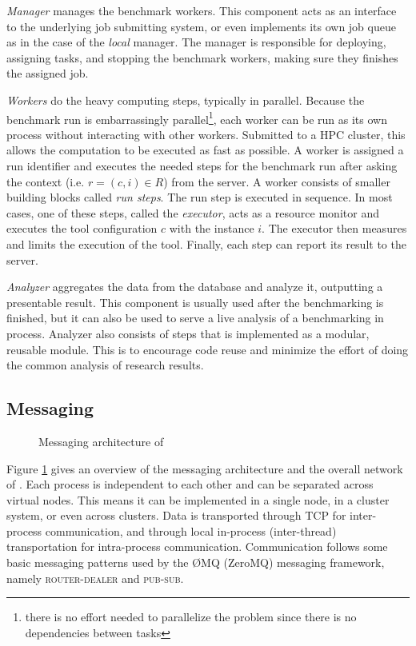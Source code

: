 \emph{Manager} manages the benchmark workers.
This component acts as an interface to the underlying job submitting system, or even implements its own job queue as in the case of the \emph{local} manager.
The manager is responsible for deploying, assigning tasks, and stopping the benchmark workers, making sure they finishes the assigned job.

\emph{Workers} do the heavy computing steps, typically in parallel.
Because the benchmark run is embarrassingly parallel\footnote{there is no effort needed to parallelize the problem since there is no dependencies between tasks}, each worker can be run as its own process without interacting with other workers.
Submitted to a HPC cluster, this allows the computation to be executed as fast as possible.
A worker is assigned a run identifier and executes the needed steps for the benchmark run after asking the context (i.e. $r = (c, i) \in R$) from the server.
A worker consists of smaller building blocks called \emph{run steps}.
The run step is executed in sequence.
In most cases, one of these steps, called the \emph{executor}, acts as a resource monitor and executes the tool configuration $c$ with the instance $i$.
The executor then measures and limits the execution of the tool.
Finally, each step can report its result to the server.

\emph{Analyzer} aggregates the data from the database and analyze it, outputting a presentable result.
This component is usually used after the benchmarking is finished, but it can also be used to serve a live analysis of a benchmarking in process.
Analyzer also consists of steps that is implemented as a modular, reusable module.
This is to encourage code reuse and minimize the effort of doing the common analysis of research results.


\subsection{Messaging}

\begin{figure}
    \caption{Messaging architecture of \OurBenchmarkingTool}
    \label{fig:zmq}
\end{figure}

Figure \ref{fig:zmq} gives an overview of the messaging architecture and the overall network of \OurBenchmarkingTool.
Each process is independent to each other and can be separated across virtual nodes.
This means it can be implemented in a single node, in a cluster system, or even across clusters.
Data is transported through TCP for inter-process communication, and through local in-process (inter-thread) transportation for intra-process communication.
Communication follows some basic messaging patterns used by the \O{}MQ (ZeroMQ) messaging framework, namely \textsc{router-dealer} and \textsc{pub-sub}.


